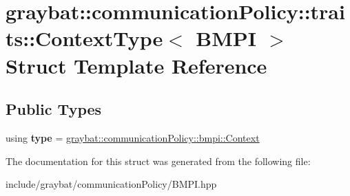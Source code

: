 \hypertarget{structgraybat_1_1communicationPolicy_1_1traits_1_1ContextType_3_01BMPI_01_4}{}\section{graybat\+:\+:communication\+Policy\+:\+:traits\+:\+:Context\+Type$<$ B\+M\+P\+I $>$ Struct Template Reference}
\label{structgraybat_1_1communicationPolicy_1_1traits_1_1ContextType_3_01BMPI_01_4}
\subsection*{Public Types}
\begin{DoxyCompactItemize}
\item 
\hypertarget{structgraybat_1_1communicationPolicy_1_1traits_1_1ContextType_3_01BMPI_01_4_a9d6676a8883e22de5761676bb7b4c584}{}using {\bfseries type} = \hyperlink{classgraybat_1_1communicationPolicy_1_1bmpi_1_1Context}{graybat\+::communication\+Policy\+::bmpi\+::\+Context}\label{structgraybat_1_1communicationPolicy_1_1traits_1_1ContextType_3_01BMPI_01_4_a9d6676a8883e22de5761676bb7b4c584}

\end{DoxyCompactItemize}


The documentation for this struct was generated from the following file\+:\begin{DoxyCompactItemize}
\item 
include/graybat/communication\+Policy/B\+M\+P\+I.\+hpp\end{DoxyCompactItemize}
